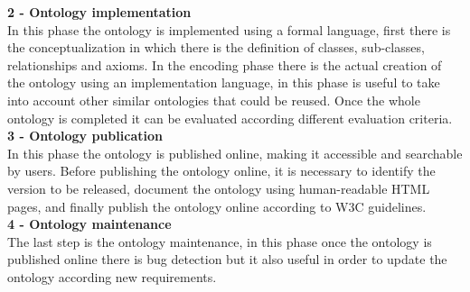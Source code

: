 \textbf{2 - Ontology implementation}\\
In this phase the ontology is implemented using a formal language, first there is the conceptualization in which there is the definition of classes, sub-classes, relationships and axioms. In the encoding phase there is the actual creation of the ontology using an implementation language, in this phase is useful to take into account other similar ontologies that could be reused. Once the whole ontology is completed it can be evaluated according different evaluation criteria. \\
\textbf{3 - Ontology publication}\\
In this phase the ontology is published online, making it accessible and searchable by users. Before publishing the ontology online, it is necessary to identify the version to be released, document the ontology using human-readable HTML pages, and finally publish the ontology online according to W3C guidelines.\cite{ontology_online}\\


\textbf{4 - Ontology maintenance}\\
The last step is the ontology maintenance, in this phase once the ontology is published online there is bug detection but it also useful in order to update the ontology according new requirements.\\

